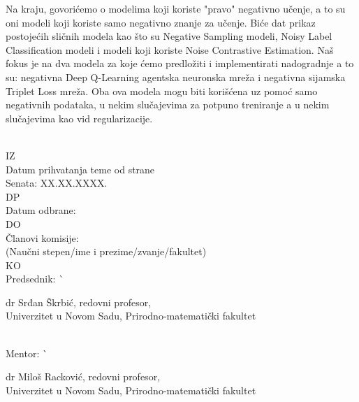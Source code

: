 \begin{tabbing}
\begin{minipage}[t]{.8\textwidth}
Na kraju, govorićemo o modelima koji koriste "pravo" negativno učenje, a to su oni modeli koji koriste samo negativno znanje za učenje. Biće dat prikaz postojećih sličnih modela kao što su Negative Sampling modeli, Noisy Label Classification modeli i modeli koji koriste Noise Contrastive Estimation. Naš fokus je na dva modela za koje ćemo predložiti i implementirati nadogradnje a to su: negativna Deep Q-Learning agentska neuronska mreža i negativna sijamska Triplet Loss mreža. Oba ova modela mogu biti korišćena uz pomoć samo negativnih podataka, u nekim slučajevima za potpuno treniranje a u nekim slučajevima kao vid regularizacije.
    \end{minipage}                                          \\
  IZ                       \>                               \\
  Datum prihvatanja teme od strane \>                       \\
  Senata:                 \> XX.XX.XXXX.                     \\
  DP                       \>                               \\
  Datum odbrane:           \>                     \\
  DO                       \>                               \\
  Članovi komisije:        \>                               \\
  \hspace*{\parindent}
  (Naučni stepen/ime i prezime/zvanje/fakultet) \>          \\
  KO                       \>                               \\
  Predsednik:              \`
    \begin{minipage}[t]{.7\textwidth}
    dr Srđan Škrbić, redovni profesor,\\
    Univerzitet u Novom Sadu, Prirodno-matematički fakultet
    \vspace*{1mm}
    \end{minipage}                                          \\
  Mentor:                    \`
    \begin{minipage}[t]{.7\textwidth}
    dr Miloš Racković, redovni profesor,\\
    Univerzitet u Novom Sadu, Pri\-ro\-d\-no-ma\-te\-ma\-ti\-č\-ki fakultet
    \vspace*{1mm}
    \end{minipage}                                          \\

\end{tabbing}
